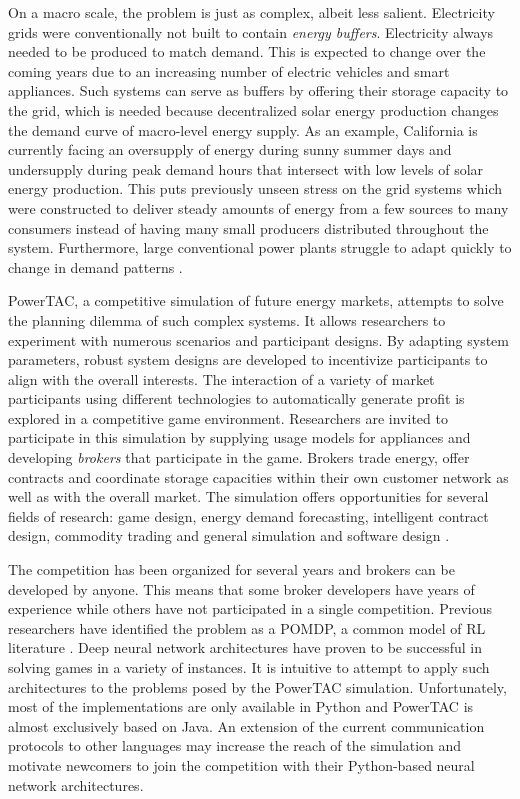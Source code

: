 On a macro scale, the problem is just as complex, albeit less salient.  Electricity grids were conventionally not built
to contain \emph{energy buffers}. Electricity always needed to be produced to match demand. This is expected to change
over the coming years due to an increasing number of electric vehicles and smart appliances. Such systems can serve as
buffers
by offering their storage capacity to the grid, which is needed because decentralized
solar energy production changes the demand curve of macro-level energy supply. As an example, California is currently
facing an
oversupply of energy during sunny summer days and undersupply during peak demand hours that intersect with low levels of
solar energy production. This puts previously unseen stress on the grid systems which were constructed to deliver steady amounts
of energy from a few sources to many consumers instead of having many small producers distributed throughout the system.
Furthermore, large conventional power plants struggle to adapt quickly to change in demand patterns
\citep{roberts_2016}.

\ac{PowerTAC}, a competitive simulation of future energy markets, attempts to solve the planning dilemma of such
complex systems. It allows researchers to experiment with numerous scenarios and participant designs. By adapting system
parameters, robust system designs are developed to incentivize participants to align with the overall
interests. The interaction of a variety of market participants using different technologies to automatically generate
profit is explored in a competitive game environment. Researchers are invited to participate in this simulation by
supplying usage models for appliances and developing \emph{brokers} that participate in the game.  Brokers trade energy,
offer contracts and coordinate storage capacities within their own customer network as well as with the overall market.
The simulation offers opportunities for several fields of research: game design, energy demand forecasting,
intelligent contract design, commodity trading and general simulation and software design
\citep{ketter2015competitive, ketter2018powertac}.

The competition has been organized for several years and brokers can be developed by anyone. This means that some
broker developers have years of experience while others have not participated in a single competition. Previous researchers have
identified the problem as a \ac{POMDP}, a common model of \ac{RL} literature \citep{tactexurieli2016mdp}. Deep neural network
architectures have proven to be successful in solving games in a variety of instances. It is intuitive to
attempt to apply such architectures to the problems posed by the \ac{PowerTAC} simulation. Unfortunately, most of the
implementations are only available in Python \citep{baselines, plappert2016kerasrl, schaarschmidt2017tensorforce}  and
\ac{PowerTAC} is almost exclusively based on Java. An extension of the current communication protocols to other
languages may increase the reach of the simulation and motivate newcomers to join the competition with
their Python-based neural network architectures.

